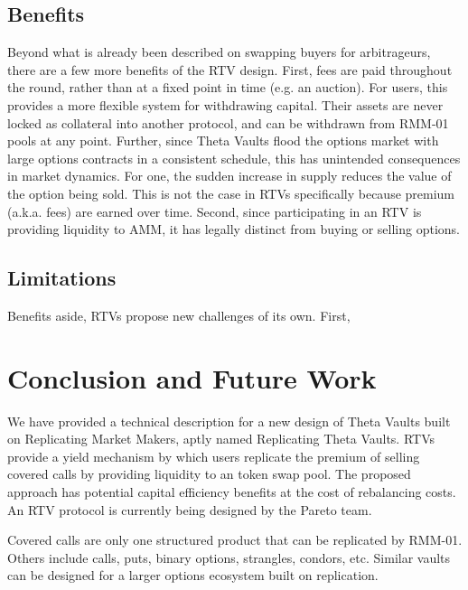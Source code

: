 \documentclass[hidelinks, 12pt]{article}
\begin{document}
\subsection{Benefits}

Beyond what is already been described on swapping buyers for arbitrageurs, there are a few more benefits of the RTV design. First, fees are paid throughout the round, rather than at a fixed point in time (e.g. an auction). For users, this provides a more flexible system for withdrawing capital. Their assets are never locked as collateral into another protocol, and can be withdrawn from RMM-01 pools at any point. Further, since Theta Vaults flood the options market with large options contracts in a consistent schedule, this has unintended consequences in market dynamics. For one, the sudden increase in supply reduces the value of the option being sold. This is not the case in RTVs specifically because premium (a.k.a. fees) are earned over time. Second, since participating in an RTV is providing liquidity to AMM, it has legally distinct from buying or selling options.

\subsection{Limitations}

Benefits aside, RTVs propose new challenges of its own. First,

\section{Conclusion and Future Work}

We have provided a technical description for a new design of Theta Vaults built on Replicating Market Makers, aptly named Replicating Theta Vaults. RTVs provide a yield mechanism by which users replicate the premium of selling covered calls by providing liquidity to an token swap pool. The proposed approach has potential capital efficiency benefits at the cost of rebalancing costs.
An RTV protocol is currently being designed by the Pareto team.

Covered calls are only one structured product that can be replicated by RMM-01. Others include calls, puts, binary options, strangles, condors, etc. Similar vaults can be designed for a larger options ecosystem built on replication.



\end{document}
